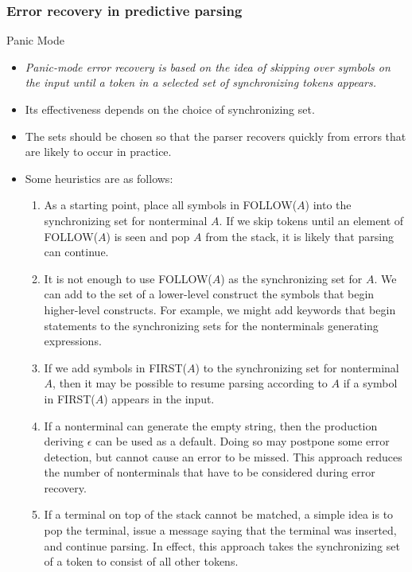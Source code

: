 \begin{bibunit}[apalike]
\subsubsection{Error recovery in predictive parsing}

\tableofcontentslide[sectionstyle={show/shaded},subsectionstyle={show/shaded/hide},subsubsectionstyle={show/shaded/hide/hide}]

\begin{frame}[allowframebreaks]{Panic Mode}
	\begin{itemize}
	\item \emph{Panic-mode error recovery is based on the idea of skipping over symbols on the input until a token in a selected set of synchronizing tokens appears.}
	\item Its effectiveness depends on the choice of synchronizing set.
	\item The sets should be chosen so that the parser recovers quickly from errors that are likely to occur in practice.
	\item Some heuristics are as follows:
		\begin{enumerate}
		\item As a starting point, place all symbols in FOLLOW($A$) into the synchronizing set for nonterminal $A$. If we skip tokens until an element of FOLLOW($A$) is seen and pop $A$ from the stack, it is likely that parsing can continue.
		\item It is not enough to use FOLLOW($A$) as the synchronizing set for $A$. We can add to the set of a lower-level construct the symbols that begin higher-level constructs. For example, we might add keywords that begin statements to the synchronizing sets for the nonterminals generating expressions.
		\item If we add symbols in FIRST($A$) to the synchronizing set for nonterminal $A$, then it may be possible to resume parsing according to $A$ if a symbol in FIRST($A$) appears in the input.
		\item If a nonterminal can generate the empty string, then the production deriving $\epsilon$ can be used as a default. Doing so may postpone some error detection, but cannot cause an error to be missed. This approach reduces the number of nonterminals that have to be considered during error recovery.
		\item If a terminal on top of the stack cannot be matched, a simple idea is to pop the terminal, issue a message saying that the terminal was inserted, and continue parsing. In effect, this approach takes the synchronizing set of a token to consist of all other tokens.
		\end{enumerate}
	\end{itemize}
\end{frame}


\end{bibunit}
